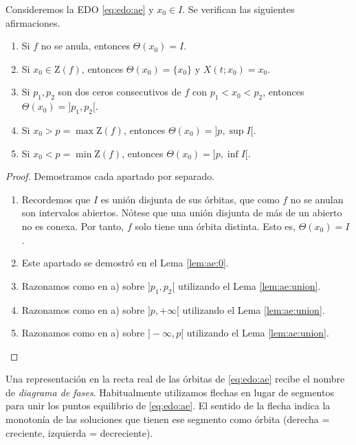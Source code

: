 \documentclass{article}
\begin{document}
\begin{prop} \label{prop:ae:intervalos} Consideremos la EDO \eqref{eq:edo:ae} y $x_0 \in I$. Se
  verifican las siguientes afirmaciones.
  \begin{enumerate}
  \item Si $f$ no se anula, entonces $\Theta(x_0) = I$.
  \item Si $x_0 \in \mathrm{Z}(f)$, entonces $\Theta(x_0) = \{x_0\}$ y $X(t; x_0) = x_0$.
  \item Si $p_1, p_2$ son dos ceros consecutivos de $f$ con $p_1 < x_0 < p_2$, entonces
    $\Theta(x_0) = ]p_1, p_2[$.
  \item Si $x_0 > p = \max \mathrm{Z}(f)$, entonces $\Theta(x_0) = ]p, \sup I[$.
  \item Si $x_0 < p = \min \mathrm{Z}(f)$, entonces $\Theta(x_0) = ]p, \inf I[$.
  \end{enumerate}
\end{prop}
\begin{proof}
  Demostramos cada apartado por separado.
  
  \begin{enumerate}
  \item Recordemos que $I$ es unión disjunta de sus órbitas, que como $f$ no se anulan son
    intervalos abiertos. Nótese que una unión disjunta de más de un abierto no es conexa. Por tanto,
    $f$ solo tiene una órbita distinta. Esto es, $\Theta(x_0) = I$.
  \item Este apartado se demostró en el Lema \ref{lem:ae:0}.
  \item Razonamos como en a) sobre $]p_1, p_2[$ utilizando el Lema \ref{lem:ae:union}.
  \item Razonamos como en a) sobre $]p, +\infty[$ utilizando el Lema \ref{lem:ae:union}.
  \item Razonamos como en a) sobre $]-\infty, p[$ utilizando el Lema \ref{lem:ae:union}. \qedhere
  \end{enumerate}
\end{proof}


\begin{definition}
  Una representación en la recta real de las órbitas de \eqref{eq:edo:ae} recibe el nombre de
  \emph{diagrama de fases}. Habitualmente utilizamos flechas en lugar de segmentos para unir los
  puntos equilibrio de \eqref{eq:edo:ae}. El sentido de la flecha indica la monotonía de las
  soluciones que tienen ese segmento como órbita (derecha = creciente, izquierda = decreciente).
\end{definition}
\end{document}

